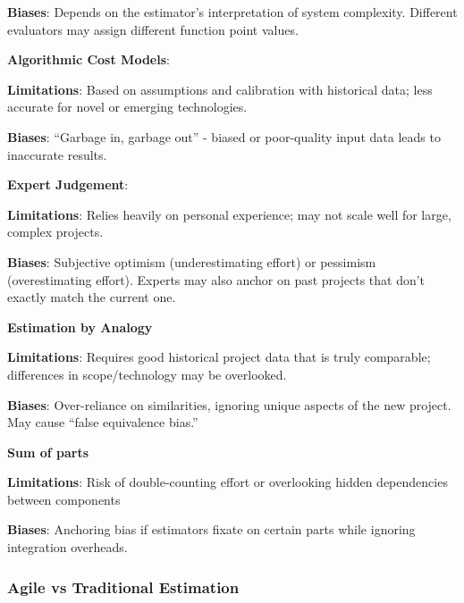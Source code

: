 \textbf{Biases}: Depends on the estimator’s interpretation of system complexity. Different evaluators may assign different function point values.

\bigskip

\noindent\textbf{Algorithmic Cost Models}:

\textbf{Limitations}: Based on assumptions and calibration with historical data; less accurate for novel or emerging technologies.

\textbf{Biases}: “Garbage in, garbage out” - biased or poor-quality input data leads to inaccurate results.

\bigskip

\noindent\textbf{Expert Judgement}: 

\textbf{Limitations}: Relies heavily on personal experience; may not scale well for large, complex projects.

\textbf{Biases}: Subjective optimism (underestimating effort) or pessimism (overestimating effort). Experts may also anchor on past projects that don’t exactly match the current one.

\bigskip

\noindent\textbf{Estimation by Analogy}

\textbf{Limitations}: Requires good historical project data that is truly comparable; differences in scope/technology may be overlooked.

\textbf{Biases}: Over-reliance on similarities, ignoring unique aspects of the new project. May cause “false equivalence bias.”

\bigskip

\noindent\textbf{Sum of parts}

\textbf{Limitations}: Risk of double-counting effort or overlooking hidden dependencies between components

\textbf{Biases}: Anchoring bias if estimators fixate on certain parts while ignoring integration overheads.

\subsubsection{Agile vs Traditional Estimation}

